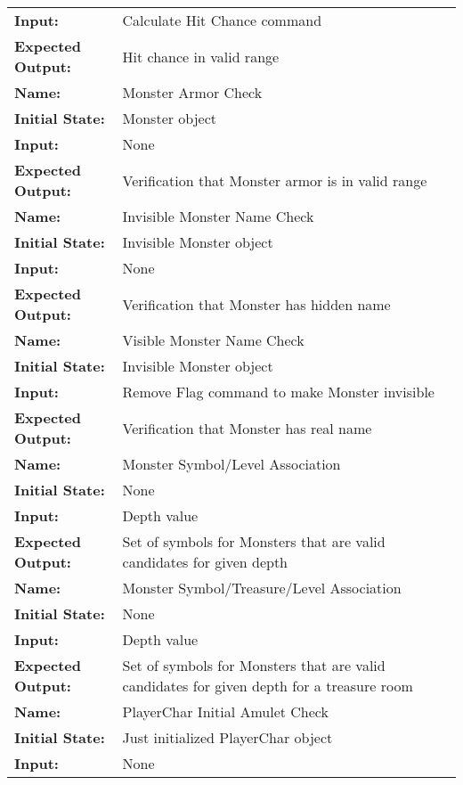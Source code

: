 \documentclass[12pt, titlepage]{article}
\begin{document}
\begin{center}
\begin{longtable}{ l | p{10cm} }
				\textbf{Input:} & Calculate Hit Chance command\\
				\textbf{Expected Output:} & Hit chance in valid range\\[0.6em]
				\hline
				\rule{0pt}{1.5em}\textbf{Name:} & Monster Armor Check\\
				\textbf{Initial State:} & Monster object\\
				\textbf{Input:} & None\\
				\textbf{Expected Output:} & Verification that Monster armor is in valid range\\[0.6em]
				\hline
				\rule{0pt}{1.5em}\textbf{Name:} & Invisible Monster Name Check\\
				\textbf{Initial State:} & Invisible Monster object\\
				\textbf{Input:} & None\\
				\textbf{Expected Output:} & Verification that Monster has hidden name\\[0.6em]
				\hline
				\rule{0pt}{1.5em}\textbf{Name:} & Visible Monster Name Check\\
				\textbf{Initial State:} & Invisible Monster object\\
				\textbf{Input:} & Remove Flag command to make Monster invisible\\
				\textbf{Expected Output:} & Verification that Monster has real name\\[0.6em]
				\hline
				\rule{0pt}{1.5em}\textbf{Name:} & Monster Symbol/Level Association\\
				\textbf{Initial State:} & None\\
				\textbf{Input:} & Depth value\\
				\textbf{Expected Output:} & Set of symbols for Monsters that are valid candidates for given depth\\[0.6em]
				\hline
				\rule{0pt}{1.5em}\textbf{Name:} & Monster Symbol/Treasure/Level Association\\
				\textbf{Initial State:} & None\\
				\textbf{Input:} & Depth value\\
				\textbf{Expected Output:} & Set of symbols for Monsters that are valid candidates for given depth for a treasure room\\[0.6em]
				\hline
				\rule{0pt}{1.5em}\textbf{Name:} & PlayerChar Initial Amulet Check\\
				\textbf{Initial State:} & Just initialized PlayerChar object\\
				\textbf{Input:} & None\\

\end{longtable}
\end{center}
\end{document}

